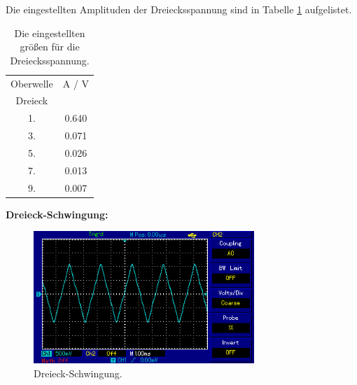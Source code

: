 Die eingestellten Amplituden der Dreiecksspannung sind in Tabelle \ref{tab:Dreis} aufgelistet.

\begin{table}[H]
  \centering
  \begin{tabular}{c c}
    \toprule
    Oberwelle & A / V \\
    Dreieck & \\
    \midrule
    1. & 0.640 \\
    3. & 0.071 \\
    5. & 0.026 \\
    7. & 0.013 \\
    9. & 0.007 \\
    \bottomrule
  \end{tabular}
  \caption{Die eingestellten größen für die Dreiecksspannung.}
  \label{tab:Dreis}
\end{table}

\textbf{Dreieck-Schwingung:} \\
\begin{figure}[H]
  \centering
  \includegraphics[height=5cm]{picture/Dreieck.PNG}
  \caption{Dreieck-Schwingung.}
  \label{fig:Drei}
\end{figure}

